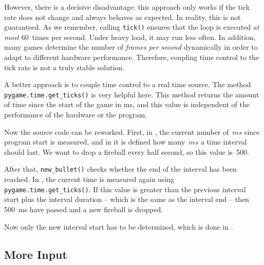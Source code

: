 \begin{warningbox}
	However, there is a decisive disadvantage: this approach only works if the tick rate does not change and always behaves as expected. In reality, this is not guaranteed. As we remember, calling \texttt{tick()} ensures that the loop is executed \emph{at most} 60~times per second. Under heavy load, it may run less often. In addition, many games determine the number of \emph{frames per second} dynamically in order to adapt to different hardware performance. Therefore, coupling time control to the tick rate is not a truly stable solution.
\end{warningbox}

A better approach is to couple time control to a real time source. The method \texttt{pygame\-.time\-.get\_ticks()} is very helpful here. This method returns the amount of time since the start of the game in \gls{ms}, and this value is independent of the performance of the hardware or the program.

Now the source code can be reworked. First, in , the current number of~$ms$ since program start is measured, and in  it is defined how many~$ms$ a time interval should last. We want to drop a fireball every half second, so this value is~500.

\newpage
{} 

 After that, \texttt{new\_bullet()} checks whether the end of the interval has been reached. In , the current time is measured again using \texttt{pygame.time.get\_ticks()}. If this value is greater than the previous interval start plus the interval duration -- which is the same as the interval end -- then \SI{500}{ms} have passed and a new fireball is dropped.  

Now only the new interval start has to be determined, which is done in .



\subsection{More Input}

